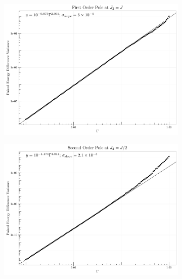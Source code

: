 \documentclass [a4paper, 11pt]{article}
\begin{document}
\begin{figure} [htbp]
\centering
\begin{subfigure}{.33\textwidth}
 \includegraphics[width=\linewidth]{pole1_gamma_dep.pdf}
\caption{}
\end{subfigure}%
\begin{subfigure}{.33\textwidth}
  \includegraphics[width=\linewidth]{pole5_gamma_dep.pdf}
\caption{}
\end{subfigure}
\begin{subfigure}{.33\textwidth}

\end{subfigure}
\end{figure}
\end{document}
